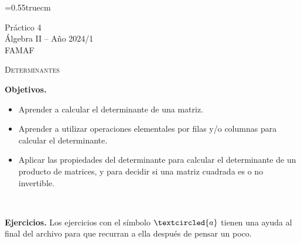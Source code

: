 \documentclass[a4paper,12pt,twoside,spanish,reqno]{amsbook}
\numberwithin{equation}{section}
\begin{document}
    \baselineskip=0.55truecm %
    
    
    {\bf \begin{center} Práctico 4 \\ Álgebra  II -- Año 2024/1 \\ FAMAF \end{center}}



\centerline{\textsc{Determinantes}}


\noindent \textbf{Objetivos.}

\begin{itemize}
\item Aprender a calcular el determinante de una matriz.

\item Aprender a utilizar operaciones elementales por filas y/o columnas para calcular el determinante.

\item Aplicar las propiedades del determinante para calcular el determinante de un producto de matrices, y para decidir si una matriz cuadrada es o no invertible.
\end{itemize}
		
\

\noindent \textbf{Ejercicios.} Los ejercicios con el símbolo $\textcircled{a}$ tienen una ayuda al final del archivo para que recurran a ella después de pensar un poco.
\end{document}
